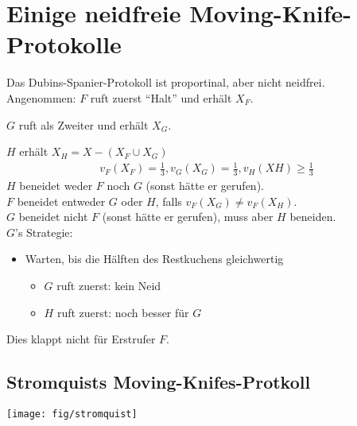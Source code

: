 \documentclass[a4paper,10pt]{scrartcl}
\begin{document}
\section{Einige neidfreie Moving-Knife-Protokolle}
Das Dubins-Spanier-Protokoll ist proportinal, aber nicht neidfrei.\\
Angenommen: $F$ ruft zuerst ``Halt'' und erhält $X_F$.

$G$ ruft als Zweiter und erhält $X_G$.

$H$ erhält $X_H=X-(X_F\cup X_G)$
\begin{align*}
 v_F(X_F)=\frac{1}{3}, v_G(X_G)=\frac{1}{3}, v_H(XH)\geq\frac{1}{3}
\end{align*}
$H$ beneidet weder $F$ noch $G$ (sonst hätte er gerufen).\\
$F$ beneidet entweder $G$ oder $H$, falls $v_F(X_G)\neq v_F(X_H)$.\\
$G$ beneidet nicht $F$ (sonst hätte er gerufen), muss aber $H$ beneiden.\\
$G$'s Strategie: \begin{itemize}
                  \item Warten, bis die Hälften des Restkuchens gleichwertig
                   \begin{itemize}
                    \item $G$ ruft zuerst: kein Neid
                    \item $H$ ruft zuerst: noch besser für $G$
                  \end{itemize}
                 \end{itemize}
Dies klappt nicht für Erstrufer $F$.
\subsection{Stromquists Moving-Knifes-Protkoll}

\begin{center}
 \texttt{[image: fig/stromquist]}
\end{center}
\end{document}

